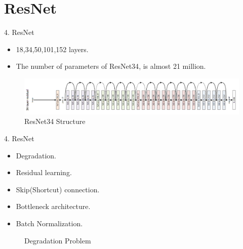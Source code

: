 \documentclass{beamer}
\begin{document}
\section{ResNet}
\begin{frame}{4. ResNet}
	\vspace{10pt}
	\begin{itemize}
		\item 18,34,50,101,152 layers.
		\item The number of parameters of ResNet34\cite{resnet},\cite{resnetbn} is almost 21 million.
	\end{itemize}
	\vspace{10pt}
	\begin{figure}[h]		
		\centering
		\includegraphics[scale=0.3]{./res/resnet34.PNG}
		\caption{ResNet34 Structure}
		\label{resnet34}
	\end{figure}
\end{frame}


\begin{frame}{4. ResNet}
	\begin{itemize}
		\item Degradation.
		\item Residual learning.
		\item Skip(Shortcut) connection.
		\item Bottleneck architecture.
		\item Batch Normalization\cite{bn}.
	\end{itemize}
	\vspace{5pt}
	\begin{figure}[h]		
		\centering
		\quad
		\caption{Degradation Problem}
		\label{degradation}
	\end{figure}
\end{frame}
\end{document}
